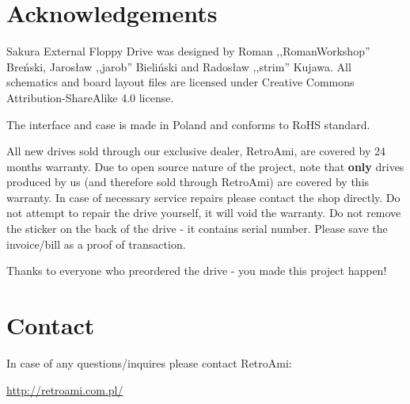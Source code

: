 \documentclass[10pt,a4paper]{article}
\begin{document}
\section*{Acknowledgements}

Sakura External Floppy Drive was designed by Roman ,,RomanWorkshop'' Breński, Jarosław ,,jarob'' Bieliński and Radosław ,,strim'' Kujawa. 
All schematics and board layout files are licensed under Creative Commons Attribution-ShareAlike 4.0 license. 

The interface and case is made in Poland and conforms to RoHS standard. 

All new drives sold through our exclusive dealer, RetroAmi, are covered by 24 months warranty. Due to open source nature of the project, note that {\bf only} drives produced by us (and therefore sold through RetroAmi) are covered by this warranty. In case of necessary service repairs please contact the shop directly. Do not attempt to repair the drive yourself, it will void the warranty. Do not remove the sticker on the back of the drive - it contains serial number. Please save the invoice/bill as a proof of transaction.

Thanks to everyone who preordered the drive - you made this project happen!

\section*{Contact}

In case of any questions/inquires please contact RetroAmi:

\url{http://retroami.com.pl/} 
\end{document}
